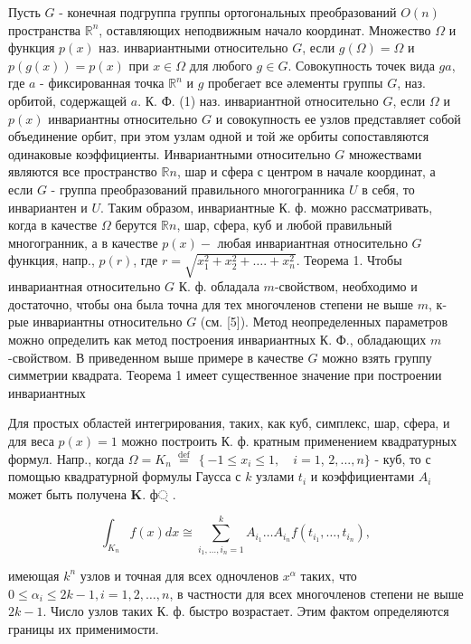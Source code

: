 \documentclass[10pt]{article}
\begin{document}
Пусть $G$ - конечная подгруппа группы ортогональных преобразований $O(n)$ пространства $\mathbb{R}^{n}$, оставляющих неподвижным начало координат. Множество $\Omega$ и функция $p(x)$ наз. инвариантными относительно $G$, если $g(\Omega)=\Omega$ и $p(g(x))=p(x)$ при $x \in \Omega$ для любого $g \in G$. Совокупность точек вида $g a$, где $a$ - фиксированная точка $\mathbb{R}^{n}$ и $g$ пробегает все әлементы группы $G$, наз. орбитой, содержащей $a$. К. Ф. (1) наз. инвариантной относительно $G$, если $\Omega$ и $p(x)$ инвариантны относительно $G$ и совокупность ее узлов представляет собой объединение орбит, при этом узлам одной и той же орбиты сопоставляются одинаковые коэффициенты. Инвариантными относительно $G$ множествами являются все пространство $\mathbb{R} n$, шар и сфера с центром в начале координат, а если $G$ - группа преобразований правильного многогранника $U$ в себя, то инвариантен и $U$. Таким образом, инвариантные К. ф. можно рассматривать, когда в качестве $\Omega$ берутся $\mathbb{R} n$, шар, сфера, куб и любой правильный многогранник, а в качестве $p(x)-$ любая инвариантная относительно $G$ функция, напр., $p(r)$, где $r=\sqrt{x_{1}^{2}+x_{2}^{2}+\ldots .+x_{n}^{2}}$. Теорема 1. Чтобы инвариантная относительно $G$ К. ф. обладала $m$-свойством, необходимо и достаточно, чтобы она была точна для тех многочленов степени не выше $m$, к-рые инвариантны относительно $G$ (см. [5]). Метод неопределенных параметров можно определить как метод построения инвариантных К. Ф., обладающих $m$-свойством. В приведенном выше примере в качестве $G$ можно взять группу симметрии квадрата. Теорема 1 имеет существенное значение при построении инвариантных



Для простых областей интегрирования, таких, как куб, симплекс, шар, сфера, и для веса $p(x)=1$ можно построить К. ф. кратным применением квадратурных формул. Напр., когда $\Omega=K_{n} \stackrel{\text { def }}{=}\left\{-1 \leqslant x_{i} \leqslant 1, \quad i=1\right.$, $2, . . ., n\}$ - куб, то с помощью квадратурной формулы Гаусса с $k$ узлами $t_{i}$ и коэффициентами $A_{i}$ может быть получена $\mathbf{K}$. ф্ .



\[

\int_{K_{n}} f(x) d x \cong \sum_{i_{1}, \ldots, i_{n}=1}^{k} A_{i_{1}} \ldots A_{i_{n}} f\left(t_{i_{1}}, \ldots, t_{i_{n}}\right),

\]



имеющая $k^{n}$ узлов и точная для всех одночленов $x^{\alpha}$ таких, что $0 \leqslant \alpha_{i} \leqslant 2 k-1, i=1,2, \ldots, n$, в частности для всех многочленов степени не выше $2 k-1$. Число узлов таких К. ф. быстро возрастает. Этим фактом определяются границы их применимости.
\end{document}
